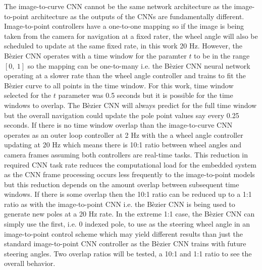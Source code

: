 \documentclass[conference]{IEEEtran}
\begin{document}
The image-to-curve CNN cannot be the same network architecture as the image-to-point architecture as the outputs of the CNNs are fundamentally different. Image-to-point controllers have a one-to-one mapping so if the image is being taken from the camera for navigation at a fixed rater, the wheel angle will also be scheduled to update at the same fixed rate, in this work 20 Hz. However, the B\`ezier CNN operates with a time window for the paramter $t$ to be in the range $[0,\ 1]$ so the mapping can be one-to-many i.e. the B\`ezier CNN neural network operating at a slower rate than the wheel angle controller and trains to fit the B\`ezier curve to all points in the time window. For this work, time window selected for the $t$ parameter was 0.5 seconds but it is possible for the time windows to overlap. The B\`ezier CNN will always predict for the full time window but the overall navigation could update the pole point values say every 0.25 seconds. If there is no time window overlap than the image-to-curve CNN operates as an outer loop controller at 2 Hz with the a wheel angle controller updating at 20 Hz which means there is 10:1 ratio between wheel angles and camera frames assuming both controllers are real-time tasks. This reduction in required CNN task rate reduces the computational load for the embedded system as the CNN frame processing occurs less frequently to the image-to-point models but this reduction depends on the amount overlap between subsequent time windows. If there is some overlap then the 10:1 ratio can be reduced up to a 1:1 ratio as with the image-to-point CNN i.e. the B\`ezier CNN is being used to generate new poles at a 20 Hz rate. In the extreme 1:1 case, the B\`ezier CNN can simply use the first, i.e. 0 indexed pole, to use as the steering wheel angle in an image-to-point control scheme which may yield different results than just the standard image-to-point CNN controller as the B\`ezier CNN trains with future steering angles. Two overlap ratios will be tested, a 10:1 and 1:1 ratio to see the overall behavior.
\end{document}
